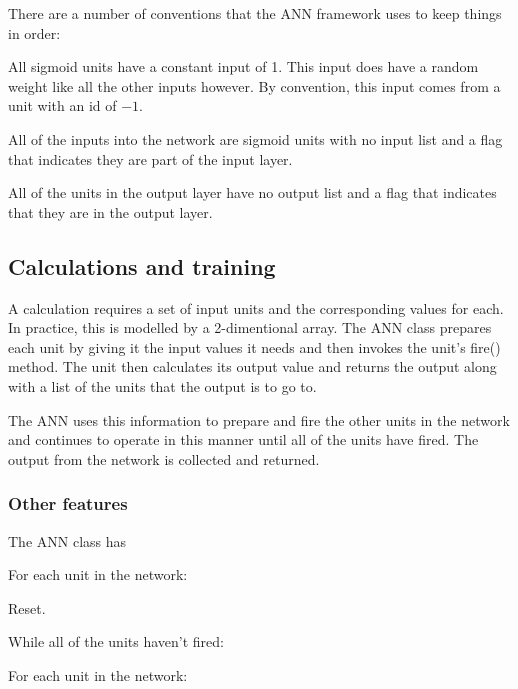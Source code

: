 \documentclass[11pt]{article}
\theoremstyle{definition}
\begin{document}
      There are a number of conventions that the ANN framework uses to keep things in order:
      \begin{itemize*}
        \item All sigmoid units have a constant input of 1. This input does have a random weight like all
              the other inputs however. By convention, this input comes from a unit with an id of $-1$.
        \item All of the inputs into the network are sigmoid units with no input list and a flag that
              indicates they are part of the input layer.
        \item All of the units in the output layer have no output list and a flag that indicates that
              they are in the output layer.
      \end{itemize*}   

    \subsection{Calculations and training}

      A calculation requires a set of input units and the corresponding values for each.
      In practice, this is modelled by a 2-dimentional array. The ANN class prepares each unit
      by giving it the input values it needs and then invokes the unit's fire() method. The
      unit then calculates its output value and returns the output along with a list of the
      units that the output is to go to.

      The ANN uses this information to prepare and fire the other units in the network and
      continues to operate in this manner until all of the units have fired. The output from
      the network is collected and returned.
         
      


      \subsubsection{Other features}
        The ANN class has 

      

      \begin{enumerate*}
        \item For each unit in the network: 
        \begin{enumerate*}
          \item Reset.
        \end{enumerate*}
        \item While all of the units haven't fired:
        \begin{enumerate*}
          \item For each unit in the network:
          \begin{enumerate*} 
            \item
          \end{enumerate*}
        \end{enumerate*}
      \end{enumerate*}
\end{document}

